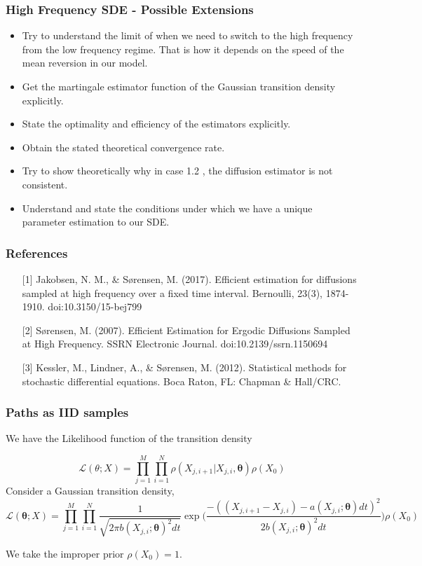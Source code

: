 \documentclass[aspectratio=169]{beamer}\usepackage[utf8]{inputenc}
\begin{document}
{

\begin{frame}\frametitle{High Frequency  SDE -  Possible Extensions}

\begin{itemize}
\item Try to understand the limit of when we need to switch to the high frequency from the low frequency regime. That is how it depends on the speed of the  mean reversion in our model.
\item Get the martingale estimator function of the Gaussian transition density explicitly.
\item State the optimality and efficiency of the estimators explicitly.
\item Obtain the stated theoretical convergence rate.
\item Try to show theoretically why in case 1.2 , the diffusion estimator is not consistent.
\item Understand and state the conditions under which we have a unique parameter estimation to our SDE.
\end{itemize}

\end{frame}
}


\begin{frame}\frametitle{References}
\begin{itemize}
\item[][1] Jakobsen, N. M., \& Sørensen, M. (2017). Efficient estimation for diffusions sampled at high frequency over a fixed time interval. Bernoulli, 23(3), 1874-1910. doi:10.3150/15-bej799
\item[][2] Sørensen, M. (2007). Efficient Estimation for Ergodic Diffusions Sampled at High Frequency. SSRN Electronic Journal. doi:10.2139/ssrn.1150694
\item[][3] Kessler, M., Lindner, A., \& Sørensen, M. (2012). Statistical methods for stochastic differential equations. Boca Raton, FL: Chapman \& Hall/CRC.
\end{itemize}

\end{frame}


\begin{frame}\frametitle{ Paths as IID samples  }

We have the Likelihood function of the transition density

\begin{equation}
\mathcal{L}(\theta;X) = \prod\limits_{j=1}^M\prod\limits_{i=1}^N\rho( {X_{j,i+1}|X_{j,i}}, \bm{\theta})  \rho(X_0) 
\end{equation}
Consider a Gaussian transition density,
\begin{equation*}
\mathcal{L}(\bm{\theta}; X) = \prod\limits_{j=1}^M \prod\limits_{i=1}^N  \frac{1}{\sqrt{2 \pi b(X_{j,i};\bm{\theta})^2 dt}  } \exp\Big(\frac{-((X_{j,i+1}-X_{j,i}) - a(X_{j,i};\bm{\theta}) dt )^2}{2b(X_{j,i};\bm{\theta})^2 dt}\Big) \rho(X_0)
\end{equation*}

We take the improper prior $\rho(X_0)=1$.

\end{frame}
\end{document}
